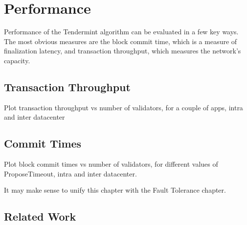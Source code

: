\chapter{Performance}

Performance of the Tendermint algorithm can be evaluated in a few key ways.
The most obvious measures are the block commit time, which is a measure of finalization latency, 
and transaction throughput, which measures the network's capacity.

\section{Transaction Throughput}

Plot transaction throughput vs number of validators, for a couple of apps, intra and inter datacenter

\section{Commit Times}

Plot block commit times vs number of validators, for different values of ProposeTimeout, intra and inter datacenter.


It may make sense to unify this chapter with the Fault Tolerance chapter.

\section{Related Work}
